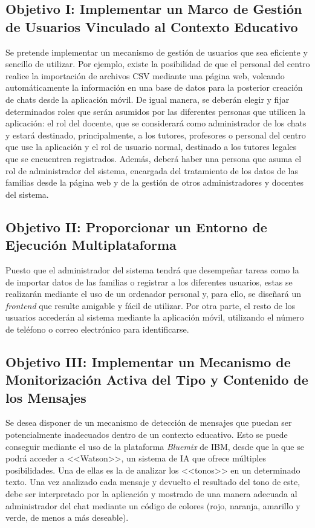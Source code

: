 \subsection{Objetivo I: Implementar un Marco de Gestión de Usuarios Vinculado al Contexto Educativo}
Se pretende implementar un mecanismo de gestión de usuarios que sea eficiente y sencillo de utilizar. Por ejemplo, existe la posibilidad de que el personal del centro realice la importación de archivos \acs{CSV} mediante una página web, volcando automáticamente la información en una base de datos para la posterior creación de chats desde la aplicación móvil. De igual manera, se deberán elegir y fijar determinados roles que serán asumidos por las diferentes personas que utilicen la aplicación: el rol del docente, que se considerará como administrador de los chats y estará destinado, principalmente, a los tutores, profesores o personal del centro que use la aplicación y el rol de usuario normal, destinado a los tutores legales que se encuentren registrados. Además, deberá haber una persona que asuma el rol de administrador del sistema, encargada del tratamiento de los datos de las familias desde la página web y de la gestión de otros administradores y docentes del sistema.

\subsection{Objetivo II: Proporcionar un Entorno de Ejecución Multiplataforma}
Puesto que el administrador del sistema tendrá que desempeñar tareas como la de importar datos de las familias o registrar a los diferentes usuarios, estas se realizarán mediante el uso de un ordenador personal y, para ello, se diseñará un \textit{frontend} que resulte amigable y fácil de utilizar. Por otra parte, el resto de los usuarios accederán al sistema mediante la aplicación móvil, utilizando el número de teléfono o correo electrónico para identificarse.

\subsection{Objetivo III: Implementar un Mecanismo de Monitorización Activa del Tipo y Contenido de los Mensajes}
Se desea disponer de un mecanismo de detección de mensajes que puedan ser potencialmente inadecuados dentro de un contexto educativo. Esto se puede conseguir mediante el uso de la plataforma \textit{Bluemix} de IBM, desde que la que se podrá acceder a <<Watson>>, un sistema de \acs{IA} que ofrece múltiples posibilidades. Una de ellas es la de analizar los <<tonos>> en un determinado texto. Una vez analizado cada mensaje y devuelto el resultado del tono de este, debe ser interpretado por la aplicación y mostrado de una manera adecuada al administrador del chat mediante un código de colores (rojo, naranja, amarillo y verde, de menos a más deseable).

